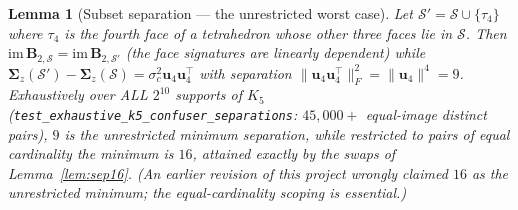 \documentclass[11pt]{article}
\newtheorem{lemma}[theorem]{Lemma}
\newcommand{\B}{\bm{B}}
\newcommand{\Scal}{\mathcal{S}}
\begin{document}
\begin{lemma}[Subset separation --- the unrestricted worst case]\label{lem:sep9}
Let $\Scal'=\Scal\cup\{\tau_4\}$ where $\tau_4$ is the fourth face of a
tetrahedron whose other three faces lie in $\Scal$. Then
$\mathrm{im}\,\B_{2,\Scal}=\mathrm{im}\,\B_{2,\Scal'}$ (the face signatures
are linearly dependent) while
$\bm\Sigma_z(\Scal')-\bm\Sigma_z(\Scal)=\sigma_c^2\bm u_4\bm u_4^{\!\top}$
with separation $\|\bm u_4\bm u_4^{\!\top}\|_F^2=\|\bm u_4\|^4=9$.
Exhaustively over ALL $2^{10}$ supports of $K_5$
(\texttt{test\_exhaustive\_k5\_}\allowbreak\texttt{confuser\_separations}: $45{,}000+$
equal-image distinct pairs), $9$ is the \emph{unrestricted minimum}
separation, while restricted to pairs of \emph{equal cardinality} the
minimum is $16$, attained exactly by the swaps of
Lemma~\ref{lem:sep16}. (An earlier revision of this project wrongly claimed
$16$ as the unrestricted minimum; the equal-cardinality scoping is
essential.)
\end{lemma}
\end{document}

